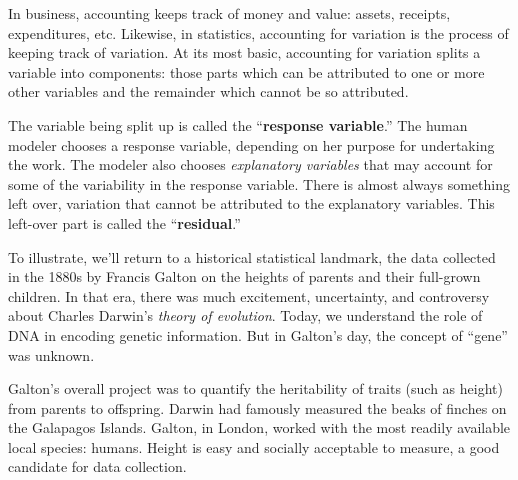 \documentclass[
  letterpaper,
  DIV=11,
  numbers=noendperiod,
  oneside]{scrartcl}
\begin{document}
In business, accounting keeps track of money and value: assets,
receipts, expenditures, etc. Likewise, in statistics, accounting for
variation is the process of keeping track of variation. At its most
basic, accounting for variation splits a variable into components: those
parts which can be attributed to one or more other variables and the
remainder which cannot be so attributed.

The variable being split up is called the ``\textbf{response
variable}.'' The human modeler chooses a response variable, depending on
her purpose for undertaking the work. The modeler also chooses
\emph{explanatory variables} that may account for some of the
variability in the response variable. There is almost always something
left over, variation that cannot be attributed to the explanatory
variables. This left-over part is called the ``\textbf{residual}.''

To illustrate, we'll return to a historical statistical landmark, the
data collected in the 1880s by Francis Galton on the heights of parents
and their full-grown children. In that era, there was much excitement,
uncertainty, and controversy about Charles Darwin's \emph{theory of
evolution}. {} Today, we understand the role of
DNA in encoding genetic information. But in Galton's day, the concept of
``gene'' was unknown.


Galton's overall project was to quantify the heritability of traits
(such as height) from parents to offspring. Darwin had famously measured
the beaks of finches on the Galapagos Islands. Galton, in London, worked
with the most readily available local species: humans. Height is easy
and socially acceptable to measure, a good candidate for data
collection. {}
\end{document}
